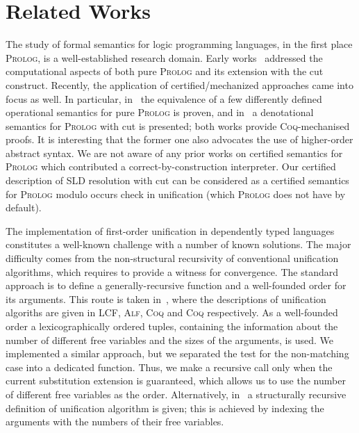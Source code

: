 \section{Related Works}

The study of formal semantics for logic programming languages, in the first place \textsc{Prolog}, is a well-established research domain. Early
works~\cite{JonesMycroftSemantics,DebrayMishraSemantics} addressed the computational aspects of both pure \textsc{Prolog} and its extension
with the cut construct. Recently, the application of certified/mechanized approaches came into focus as well. In particular,
in~\cite{CertifiedPrologEquivalences} the equivalence of a few differently defined operational semantics
for pure \textsc{Prolog} is proven, and in~\cite{CeritfiedDenotationalCut} a denotational semantics for \textsc{Prolog} with cut is presented; both
works provide \textsc{Coq}-mechanised proofs. It is interesting that the former one also advocates the use of higher-order
abstract syntax. We are not aware of any prior works on certified semantics for \textsc{Prolog} which contributed a correct-by-construction
interpreter. Our certified description of SLD resolution with cut can be considered as a certified semantics for \textsc{Prolog} modulo
occurs check in unification (which \textsc{Prolog} does not have by default).

The implementation of first-order unification in dependently typed languages constitutes a well-known challenge with a number of
known solutions. The major difficulty comes from the non-structural recursivity of conventional unification algorithms, which
requires to provide a witness for convergence. The standard approach is to define a generally-recursive function and a well-founded order
for its arguments. This route is taken in~\cite{MGUinLCF,MGUinMLTT,IdempMGUinCoq,TextbookMGUinCoq}, where the descriptions of
unification algoriths are given in \textsc{LCF}, \textsc{Alf}, \textsc{Coq} and \textsc{Coq} respectively. As a well-founded
order a lexicographically ordered tuples, containing the information about the number of different free variables and the sizes of
the arguments, is used. We implemented a similar approach, but we separated the test for the non-matching case into a dedicated
function. Thus, we make a recursive call only when the current substitution extension is guaranteed, which allows us to use the
number of different free variables as the order. Alternatively, in~\cite{StructuralMGU} a structurally recursive definition of
unification algorithm is given; this is achieved by indexing the arguments with the numbers of their free variables.

